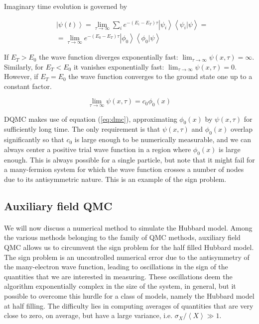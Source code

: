 \documentclass[10pt, twocolumn, twoside]{article}
\begin{document}
Imaginary time evolution is governed by

\begin{equation}\label{eq:im_ev}
\begin{split}
&\left| \psi (t) \right\rangle = \lim_{\tau \rightarrow \infty} \sum_i e^{-(E_i - E_T) \tau} \left| \psi_i \right\rangle \left\langle\psi_i | \psi \right\rangle = \\
&= \lim_{\tau \rightarrow \infty} e^{-(E_0 - E_T)\tau} \left| \phi_0 \right\rangle \left\langle \phi_0 | \psi \right\rangle
\end{split}
\end{equation}


If $E_T > E_0$ the wave function diverges exponentially fast: $\lim_{\tau \rightarrow \infty} \psi ( x, \tau) = \infty$. Similarly, for $E_T < E_0$ it vanishes exponentially fast: $
\lim_{\tau \rightarrow \infty} \psi ( x, \tau) = 0$. However, if $E_T = E_0$ the wave function converges to the ground state one up to a constant factor.

\begin{equation}\label{eq:dmc}
\lim_{\tau \rightarrow \infty} \psi ( x, \tau) = c_0 \phi_0 (x)
\end{equation}

DQMC makes use of equation (\ref{eq:dmc}), approximating $\phi_0(x)$ by $\psi (x, \tau)$ for sufficiently long time. The only requirement is that $\psi (x, \tau)$ and $\phi_0(x)$ overlap significantly so that $c_0$ is large enough to be numerically measurable, and we can always center a positive trial wave function in a region where $\phi_0(x)$ is large enough. This is always possible for a single particle,  but note that it might fail for a many-fermion system for which the wave function crosses a number of nodes due to its antisymmetric nature. This is an example of the sign problem.\par

\subsection{Auxiliary field QMC}\paragraph{}

We will now discuss a numerical method to simulate the Hubbard model. Among the various methods belonging to the family of QMC methods, auxiliary field QMC allows us to circumvent the sign problem for the half filled Hubbard model. The sign problem is an uncontrolled numerical error due to the antisymmetry of the many-electron wave function, leading to oscillations in the sign of the quantities that we are interested in measuring. These oscillations deem the algorithm exponentially complex in the size of the system, in general, but it possible to overcome this hurdle for a class of models, namely the Hubbard model at half filling. The difficulty lies in computing averages of quantities that are very close to zero, on average, but have a large variance, i.e. $\sigma_X / \left\langle X \right\rangle \gg 1$.
\end{document}
